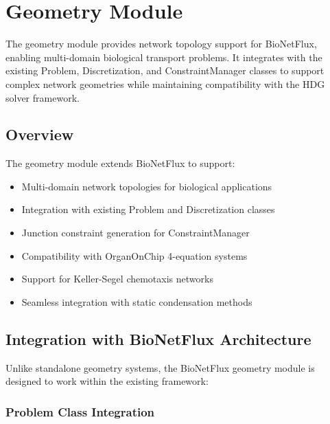 \section{Geometry Module}
\label{sec:geometry_module}

The geometry module provides network topology support for BioNetFlux, enabling multi-domain biological transport problems. It integrates with the existing Problem, Discretization, and ConstraintManager classes to support complex network geometries while maintaining compatibility with the HDG solver framework.

\subsection{Overview}
\label{subsec:geometry_overview}

The geometry module extends BioNetFlux to support:

\begin{itemize}
	\item Multi-domain network topologies for biological applications
	\item Integration with existing Problem and Discretization classes
	\item Junction constraint generation for ConstraintManager
	\item Compatibility with OrganOnChip 4-equation systems
	\item Support for Keller-Segel chemotaxis networks
	\item Seamless integration with static condensation methods
\end{itemize}

\subsection{Integration with BioNetFlux Architecture}
\label{subsec:bionetflux_integration}

Unlike standalone geometry systems, the BioNetFlux geometry module is designed to work within the existing framework:

\subsubsection{Problem Class Integration}

